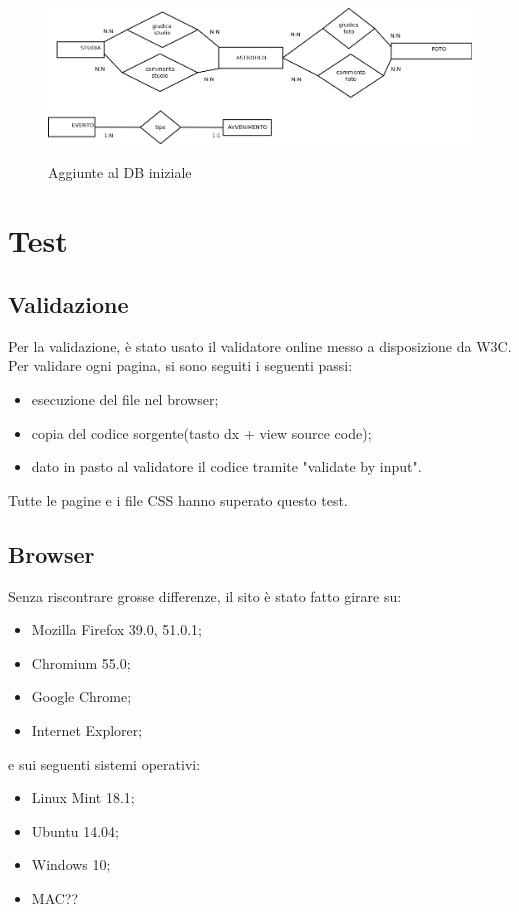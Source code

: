 	\begin{figure}
		\includegraphics[scale=0.35]{images/DBplus.png}\\[1cm] \caption{Aggiunte al DB iniziale}
	\end{figure}
	\newpage
	\section{Test}
	\subsection{Validazione}
	Per la validazione, è stato usato il validatore online messo a disposizione da W3C. Per validare ogni pagina, si sono seguiti i seguenti passi:
	\begin{itemize}
		\item esecuzione del file nel browser;
		\item copia del codice sorgente(tasto dx + view source code);
		\item dato in pasto al validatore il codice tramite "validate by input".
	\end{itemize}
	Tutte le pagine e i file CSS hanno superato questo test.
	\subsection{Browser}
	Senza riscontrare grosse differenze, il sito è stato fatto girare su:
	\begin{itemize}
		\item Mozilla Firefox 39.0, 51.0.1;
		\item Chromium 55.0;
		\item Google Chrome;
		\item Internet Explorer;
		
	\end{itemize}
	e sui seguenti sistemi operativi:
	\begin{itemize}
		\item Linux Mint 18.1;
		\item Ubuntu 14.04;
		\item Windows 10;
		\item MAC??
	\end{itemize}
